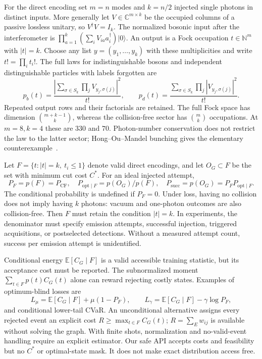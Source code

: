 \documentclass[11pt,a4paper]{article}
\theoremstyle{remark}\newtheorem{remark}[theorem]{Remark}
\newcommand{\E}{\mathbb E}
\newcommand{\CF}{\mathrm{CF}}
\newcommand{\opt}{\mathrm{opt}}
\newcommand{\succp}{P_{\mathrm{succ}}}
\begin{document}
For the direct encoding set $m=n$ modes and $k=n/2$ injected single photons in distinct inputs. More generally let $V\in\mathbb C^{m\times k}$ be the occupied columns of a passive lossless unitary, so $V^\dagger V=I_k$. The normalized bosonic input after the interferometer is $\prod_{a=1}^k(\sum_iV_{ia}a_i^\dagger)|0\rangle$. An output is a Fock occupation $t\in\mathbb N^m$ with $|t|=k$. Choose any list $y=(y_1,\ldots,y_k)$ with these multiplicities and write $t!=\prod_i t_i!$. The full laws for indistinguishable bosons and independent distinguishable particles with labels forgotten are
\begin{equation}
 p_b(t)=\frac{\left|\sum_{\sigma\in S_k}\prod_jV_{y_j,\sigma(j)}\right|^2}{t!},\qquad
 p_d(t)=\frac{\sum_{\sigma\in S_k}\prod_j|V_{y_j,\sigma(j)}|^2}{t!}.\label{eq:laws}
\end{equation}
Repeated output rows and their factorials are retained. The full Fock space has dimension $\binom{m+k-1}{k}$, whereas the collision-free sector has $\binom{m}{k}$ occupations. At $m=8,k=4$ these are $330$ and $70$. Photon-number conservation does not restrict the law to the latter sector; Hong--Ou--Mandel bunching gives the elementary counterexample~\cite{hom1987}.

Let $F=\{t:|t|=k,\ t_i\le1\}$ denote valid direct encodings, and let $O_G\subset F$ be the set with minimum cut cost $C^*$. For an ideal injected attempt,
\begin{equation}
 P_F=p(F)=P_{\CF},\quad P_{\opt\mid F}=p(O_G)/p(F),\quad
 \succp=p(O_G)=P_F P_{\opt\mid F}.\label{eq:success}
\end{equation}
The conditional probability is undefined if $P_F=0$. Under loss, having no collision does not imply having $k$ photons: vacuum and one-photon outcomes are also collision-free. Then $F$ must retain the condition $|t|=k$. In experiments, the denominator must specify emission attempts, successful injection, triggered acquisitions, or postselected detections. Without a measured attempt count, success per emission attempt is unidentified.

Conditional energy $\E[C_G\mid F]$ is a valid accessible training statistic, but its acceptance cost must be reported. The subnormalized moment $\sum_{t\in F}p(t)C_G(t)$ alone can reward rejecting costly states. Examples of optimum-blind losses are
\begin{equation}
 L_\mu=\E[C_G\mid F]+\mu(1-P_F),\qquad
 L_\gamma=\E[C_G\mid F]-\gamma\log P_F,\label{eq:train}
\end{equation}
and conditional lower-tail CVaR. An unconditional alternative assigns every rejected event an explicit cost $R\ge\max_{t\in F}C_G(t)$; $R=\sum_Ew_{ij}$ is available without solving the graph. With finite shots, normalization and no-valid-event handling require an explicit estimator. Our safe API accepts costs and feasibility but no $C^*$ or optimal-state mask. It does not make exact distribution access free.
\end{document}

